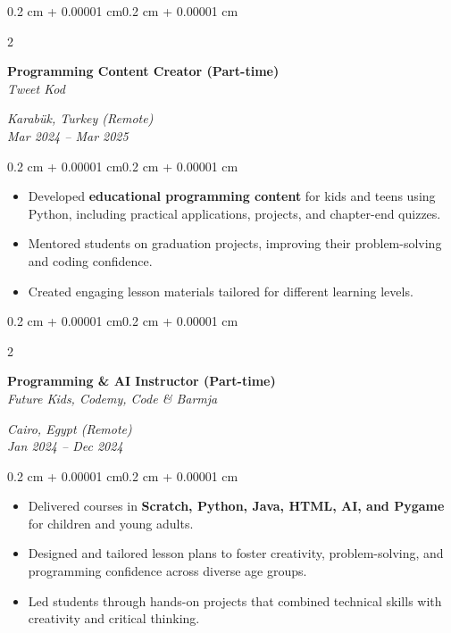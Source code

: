 \documentclass[10pt, letterpaper]{article}
\newenvironment{highlights}{
  \begin{itemize}[
    topsep=0.10 cm,
    parsep=0.10 cm,
    partopsep=0pt,
    itemsep=0pt,
    leftmargin=0.4 cm + 10pt
  ]}
  {\end{itemize}
}
\newenvironment{onecolentry}{
  \begin{adjustwidth}{0.2 cm + 0.00001 cm}{0.2 cm + 0.00001 cm}
}{
  \end{adjustwidth}
}
\newenvironment{twocolentry}[2][]{
  \onecolentry
  \def\secondColumn{#2}
  \setcolumnwidth{\fill, 4.5 cm}
  \begin{paracol}{2}
}{
  \switchcolumn \raggedleft \secondColumn
  \end{paracol}
  \endonecolentry
}
\begin{document}
\begin{twocolentry}{
  \textit{Karabük, Turkey (Remote)} \\
  \textit{Mar 2024 -- Mar 2025}}
  \textbf{Programming Content Creator (Part-time)} \\
  \textit{Tweet Kod}
\end{twocolentry}
\vspace{0.10 cm}
\begin{onecolentry}
  \begin{highlights}
    \item Developed \textbf{educational programming content} for kids and teens using Python, including practical applications, projects, and chapter-end quizzes.
    \item Mentored students on graduation projects, improving their problem-solving and coding confidence.
    \item Created engaging lesson materials tailored for different learning levels.
  \end{highlights}
\end{onecolentry}

\begin{twocolentry}{
  \textit{Cairo, Egypt (Remote)} \\
  \textit{Jan 2024 -- Dec 2024}}
  \textbf{Programming \& AI Instructor (Part-time)} \\
  \textit{Future Kids, Codemy, Code \& Barmja}
\end{twocolentry}
\vspace{0.10 cm}
\begin{onecolentry}
  \begin{highlights}
    \item Delivered courses in \textbf{Scratch, Python, Java, HTML, AI, and Pygame} for children and young adults.
    \item Designed and tailored lesson plans to foster creativity, problem-solving, and programming confidence across diverse age groups.
    \item Led students through hands-on projects that combined technical skills with creativity and critical thinking.
  \end{highlights}
\end{onecolentry}

\end{document}
